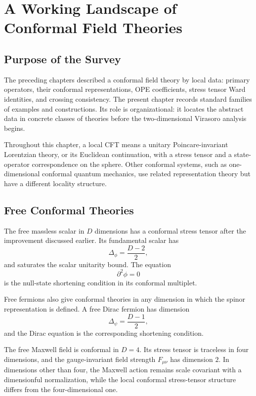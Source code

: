 \chapter{A Working Landscape of Conformal Field Theories}
\label{ch:volume-iii-landscape-cfts}

\section{Purpose of the Survey}

The preceding chapters described a conformal field theory by local data:
primary operators, their conformal representations, OPE coefficients, stress
tensor Ward identities, and crossing consistency.  The present chapter records
standard families of examples and constructions.  Its role is organizational:
it locates the abstract data in concrete classes of theories before the
two-dimensional Virasoro analysis begins.

Throughout this chapter, a local CFT means a unitary Poincare-invariant
Lorentzian theory, or its Euclidean continuation, with a stress tensor and a
state-operator correspondence on the sphere.  Other conformal systems, such as
one-dimensional conformal quantum mechanics, use related representation theory
but have a different locality structure.

\section{Free Conformal Theories}

The free massless scalar in \(D\) dimensions has a conformal stress tensor
after the improvement discussed earlier.  Its fundamental scalar has
\[
  \Delta_\phi=\frac{D-2}{2},
\]
and saturates the scalar unitarity bound.  The equation
\[
  \partial^2\phi=0
\]
is the null-state shortening condition in its conformal multiplet.

Free fermions also give conformal theories in any dimension in which the
spinor representation is defined.  A free Dirac fermion has dimension
\[
  \Delta_\psi=\frac{D-1}{2},
\]
and the Dirac equation is the corresponding shortening condition.

The free Maxwell field is conformal in \(D=4\).  Its stress tensor is traceless
in four dimensions, and the gauge-invariant field strength \(F_{\mu\nu}\) has
dimension \(2\).  In dimensions other than four, the Maxwell action remains
scale covariant with a dimensionful normalization, while the local conformal
stress-tensor structure differs from the four-dimensional one.

